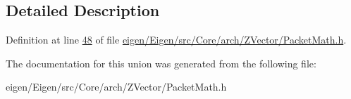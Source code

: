 \subsection{Detailed Description}


Definition at line \hyperlink{eigen_2_eigen_2src_2_core_2arch_2_z_vector_2_packet_math_8h_source_l00048}{48} of file \hyperlink{eigen_2_eigen_2src_2_core_2arch_2_z_vector_2_packet_math_8h_source}{eigen/\+Eigen/src/\+Core/arch/\+Z\+Vector/\+Packet\+Math.\+h}.



The documentation for this union was generated from the following file\+:\begin{DoxyCompactItemize}
\item 
eigen/\+Eigen/src/\+Core/arch/\+Z\+Vector/\+Packet\+Math.\+h\end{DoxyCompactItemize}
